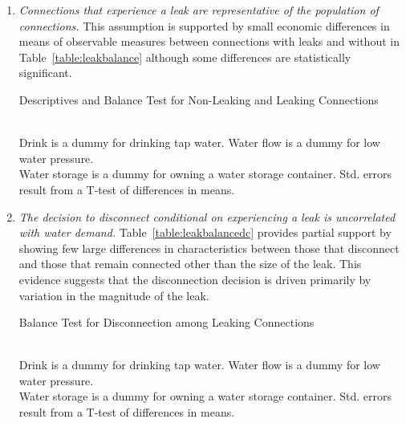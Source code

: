 \documentclass[12pt]{article}
\begin{document}
\begin{appendices}
\begin{enumerate}
	\item \textit{ Connections that experience a leak are representative of the population of connections. }  This assumption is supported by small economic differences in means of observable measures between connections with leaks and without in Table~\ref{table:leakbalance} although some differences are statistically significant.  
\begin{table}
\centering
\caption{Descriptives and Balance Test for Non-Leaking and Leaking Connections}\label{table:leakbalance}
 \\
\footnotesize{Drink is a dummy for drinking tap water.  Water flow is a dummy for low water pressure. \\ Water storage is a dummy for owning a water storage container.  Std. errors result from a T-test of differences in means.}
\end{table}

	\item  \textit{ The decision to disconnect conditional on experiencing a leak is uncorrelated with water demand. }  Table~\ref{table:leakbalancedc} provides partial support by showing few large differences in characteristics between those that disconnect and those that remain connected other than the size of the leak.  This evidence suggests that the disconnection decision is driven primarily by variation in the magnitude of the leak.
\begin{table}
\centering
\caption{Balance Test for Disconnection among Leaking Connections}\label{table:leakbalancedc}
 \\
\footnotesize{Drink is a dummy for drinking tap water.  Water flow is a dummy for low water pressure. \\ Water storage is a dummy for owning a water storage container. Std. errors result from a T-test of differences in means.}
\end{table}


\end{enumerate}
\end{appendices}
\end{document}
